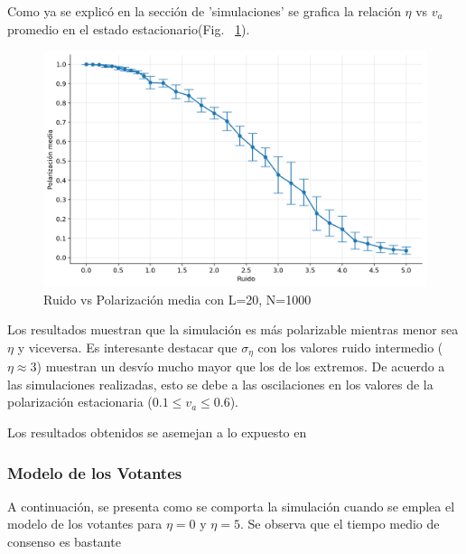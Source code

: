 \documentclass{article}
\begin{document}
Como ya se explicó en la sección de 'simulaciones' se grafica la relación \(\eta\) vs \(v_a\) promedio en el estado estacionario(Fig. ~\ref{fig:5}).

\begin{figure}[H]
    \centering
    \includegraphics[width=1\linewidth]{noise_vs_polarization.png}
    \caption{Ruido vs Polarización media con L=20, N=1000}
    \label{fig:5}
\end{figure}

Los resultados muestran que la simulación es más polarizable mientras menor sea \(\eta\) y viceversa. Es interesante destacar que \(\sigma_{\eta}\) con los valores ruido intermedio (\(\eta \approx 3\)) muestran un desvío mucho mayor que los de los extremos. De acuerdo a las simulaciones realizadas, esto se debe a las oscilaciones en los valores de la polarización estacionaria (\(0.1\leq v_a\leq0.6\)).

Los resultados obtenidos se asemejan a lo expuesto en \cite{vicsek1995}




\subsubsection{Modelo de los Votantes }

A continuación, se presenta como se comporta la simulación cuando se emplea el modelo de los votantes para  \(\eta =0\)  y \(\eta =5\). Se observa que el tiempo medio de consenso es bastante 
\end{document}
